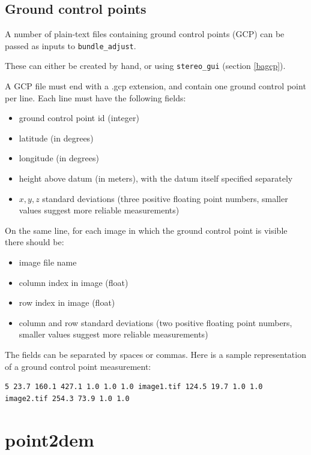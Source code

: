 \subsection{Ground control points}

A number of plain-text files containing ground control points (GCP) can be
passed as inputs to \texttt{bundle\_adjust}.

These can either be created by hand, or using \texttt{stereo\_gui}
(section \ref{bagcp}).

A GCP file must end with a .gcp extension, and contain one ground
control point per line. Each line must have the following fields:
\begin{itemize}
\item ground control point id (integer)
\item latitude (in degrees)
\item longitude (in degrees)
\item height above datum (in meters), with the datum itself specified separately
\item $x, y, z$ standard deviations (three positive floating point
  numbers, smaller values suggest more reliable measurements)
\end{itemize}

On the same line, for each image in which the ground control point is
visible there should be:

\begin{itemize}
\item image file name
\item column index in image (float)
\item row index in image (float)
\item column and row standard deviations (two positive floating point
  numbers, smaller values suggest more reliable measurements)
\end{itemize}

The fields can be separated by spaces or commas. Here is a sample representation
of a ground control point measurement:

\begin{verbatim}
5 23.7 160.1 427.1 1.0 1.0 1.0 image1.tif 124.5 19.7 1.0 1.0 image2.tif 254.3 73.9 1.0 1.0
\end{verbatim}

\section{point2dem}
\label{point2dem}

